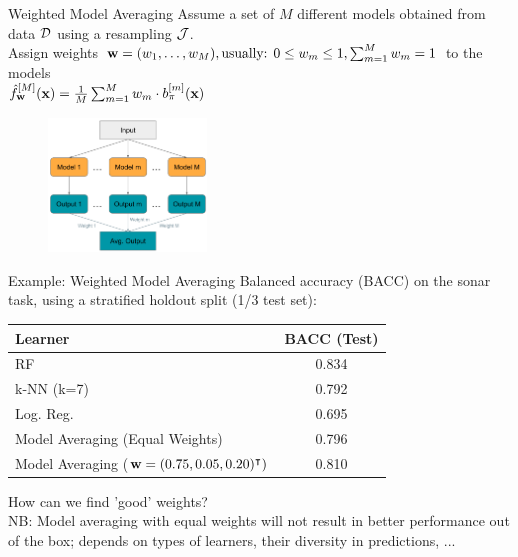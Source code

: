 \documentclass[10pt,compress,t,notes=noshow, xcolor=table]{beamer}
\begin{document}

\begin{vbframe}{Weighted Model Averaging}
Assume a set of $M$ different models obtained from data $\mathcal{D}$ using a resampling $\mathcal{J}$.\\
\vfill
Assign weights $\mathbf{w} = (w_{1}, \ldots, w_{M}), \text{usually: } 0 \le w_{m} \le 1, \sum_{m=1}^{M} w_{m} = 1$ to the models\\
\vfill
$\hat{f}_{\mathbf{w}}^{[M]}(\mathbf{x}) = \frac{1}{M} \sum_{m = 1}^{M} w_{m} \cdot b_{\pi}^{[m]}(\mathbf{x})$\\
\begin{figure}
    \centering
    \includegraphics[width=0.375\textwidth]{figure/Weighted_Model_Averaging.pdf}
    \label{fig:weighted_model_averaging}
\end{figure}

\end{vbframe}


\begin{vbframe}{Example: Weighted Model Averaging}
\vfill
Balanced accuracy (BACC) on the sonar task, using a stratified holdout split (1/3 test set):
\vfill
\begin{table}[h]
\centering
\begin{tabular}{lc}
\hline
\textbf{Learner} & \textbf{BACC} (Test) \\
\hline
RF & 0.834 \\
k-NN (k=7) & 0.792 \\
Log. Reg. & 0.695 \\
Model Averaging (Equal Weights) & 0.796 \\
Model Averaging ($\mathbf{w} = (0.75, 0.05, 0.20)^\intercal)$ & 0.810 \\
\hline
\end{tabular}
\label{table:learners_test}
\end{table}
\vfill
How can we find 'good' weights?\\
\vfill
NB: Model averaging with equal weights will not result in better performance out of the box; depends on types of learners, their diversity in predictions, ...
\vfill
\end{vbframe}
\end{document}
